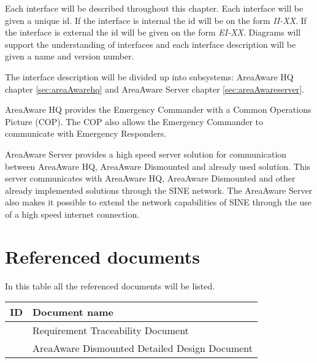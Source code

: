 Each interface will be described throughout this chapter. Each interface will be given a unique id. If the interface is internal the id will be on the form \emph{II-XX}. If the interface is external the id will be given on the form \emph{EI-XX}. Diagrams will support the understanding of interfaces and each interface description will be given a name and version number.

The interface description will be divided up into subsystems: AreaAware HQ chapter \ref{sec:areaAwarehq} and AreaAware Server chapter \ref{sec:areaAwareserver}.

AreaAware HQ provides the Emergency Commander with a Common Operations Picture (COP). The COP also allows the Emergency Commander to communicate with Emergency Responders.

AreaAware Server provides a high speed server solution for communication between AreaAware HQ, AreaAware Dismounted and already used solution. This server communicates with AreaAware HQ, AreaAware Dismounted and other already implemented solutions through the SINE network. The AreaAware Server also makes it possible to extend the network capabilities of SINE through the use of a high speed internet connection.

\section{Referenced documents}
In this table all the referenced documents will be listed. \\

\begin{tabular}{b{6cm} b{7cm}}
	\textbf{ID} & \textbf{Document name} \\
	\hline
	\rtm & Requirement Traceability Document \\
	\aadisddd & AreaAware Dismounted Detailed Design Document\\
\end{tabular}